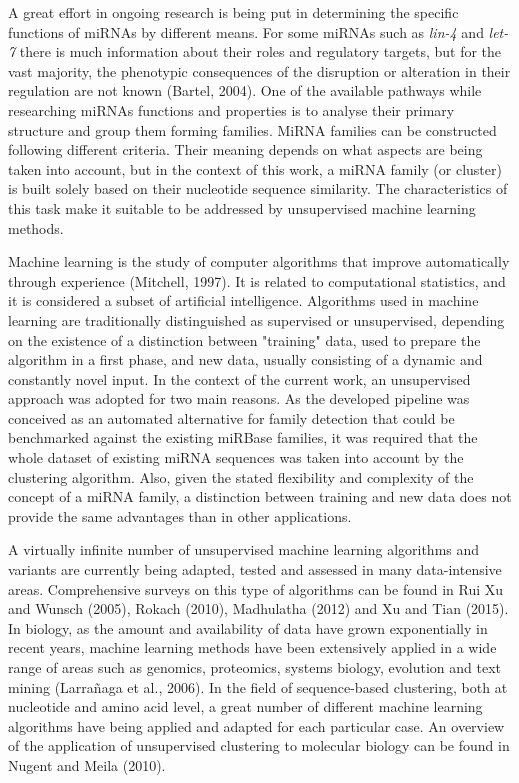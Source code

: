 \documentclass[nocrop]{bioinfo}
\begin{document}
A great effort in ongoing research is being put in determining the specific functions of miRNAs by different means. For some miRNAs such as \textit{lin-4} and \textit{let-7} there is much information about their roles and regulatory targets, but for the vast majority, the phenotypic consequences of the disruption or alteration in their regulation are not known (Bartel, 2004). One of the available pathways while researching miRNAs functions and properties is to analyse their primary structure and group them forming families. MiRNA families can be constructed following different criteria. Their meaning depends on what aspects are being taken into account, but in the context of this work, a miRNA family (or cluster) is built solely based on their nucleotide sequence similarity. The characteristics of this task make it suitable to be addressed by unsupervised machine learning methods.

Machine learning is the study of computer algorithms that improve automatically through experience (Mitchell, 1997). It is related to computational statistics, and it is considered a subset of artificial intelligence. Algorithms used in machine learning are traditionally distinguished as supervised or unsupervised, depending on the existence of a distinction between "training" data, used to prepare the algorithm in a first phase, and new data, usually consisting of a dynamic and constantly novel input. In the context of the current work, an unsupervised approach was adopted for two main reasons. As the developed pipeline was conceived as an automated alternative for family detection that could be benchmarked against the existing miRBase families, it was required that the whole dataset of existing miRNA sequences was taken into account by the clustering algorithm. Also, given the stated flexibility and complexity of the concept of a miRNA family, a distinction between training and new data does not provide the same advantages than in other applications.

A virtually infinite number of unsupervised machine learning algorithms and variants are currently being adapted, tested and assessed in many data-intensive areas. Comprehensive surveys on this type of algorithms can be found in Rui Xu and Wunsch (2005), Rokach (2010), Madhulatha (2012) and Xu and Tian (2015). In biology, as the amount and availability of data have grown exponentially in recent years, machine learning methods have been extensively applied in a wide range of areas such as genomics, proteomics, systems biology, evolution and text mining (Larra\~naga et al., 2006). In the field of sequence-based clustering, both at nucleotide and amino acid level, a great number of different machine learning algorithms have being applied and adapted for each particular case. An overview of the application of unsupervised clustering to molecular biology can be found in Nugent and Meila (2010).
\end{document}
